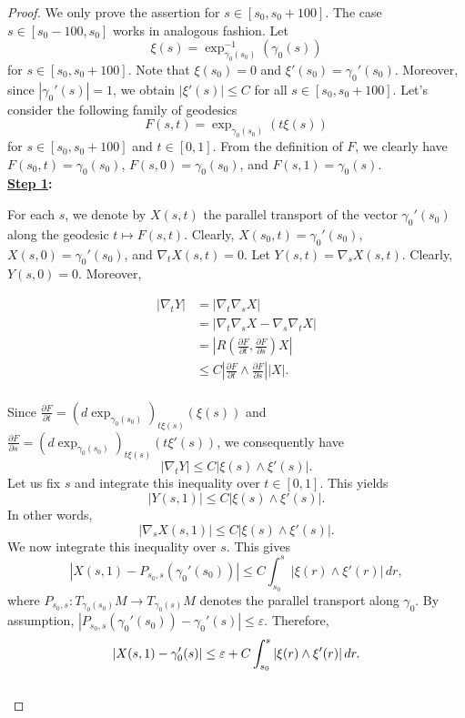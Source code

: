 \documentclass[a4paper, reqno]{amsart}
\theoremstyle{definition}
\theoremstyle{remark}
\numberwithin{equation}{section}
\numberwithin{equation}{section}
\numberwithin{equation}{section}
\begin{document}
\begin{proof}
We only prove the assertion for $s \in [s_0,s_0+100]$. The case $s \in [s_0-100,s_0]$ works in analogous fashion. Let
 \[\xi(s) = \exp_{\gamma_0(s_0)}^{-1}(\gamma_0(s))\]
  for $s \in [s_0,s_0+100]$. Note that $\xi(s_0)=0$ and $\xi'(s_0) = \gamma_0'(s_0)$. Moreover, since $|\gamma_0'(s)|=1$, we obtain $|\xi'(s)| \leq C$ for all $s \in [s_0,s_0+100]$. Let's consider the following family of geodesics
   \[F(s,t) = \exp_{\gamma_0(s_0)}(t \xi(s))\]
    for $s \in [s_0,s_0+100]$ and $t \in [0,1]$. From the definition of $F$, we clearly have $F(s_0,t) = \gamma_0(s_0)$, $F(s,0) = \gamma_0(s_0)$, and $F(s,1) = \gamma_0(s)$.\\ 
  
  \textbf{\underline{Step 1}:} 
   
    For each $s$, we denote by $X(s,t)$ the parallel transport of the vector $\gamma_0'(s_0)$ along the geodesic $t \mapsto F(s,t)$. Clearly, $X(s_0,t) = \gamma_0'(s_0)$, $X(s,0) = \gamma_0'(s_0)$, and $\nabla_t X(s,t) = 0$. Let $Y(s,t) = \nabla_s X(s,t)$. Clearly, $Y(s,0) = 0$. Moreover,  
    
\begin{align*} 
|\nabla_t Y| 
&= |\nabla_t \nabla_s X| \\ 
&= |\nabla_t \nabla_s X - \nabla_s \nabla_t X| \\ 
&= \left|R\left(\frac{\partial F}{\partial t},\frac{\partial F}{\partial s}\right)X\right| \\ 
&\leq C \left|\frac{\partial F}{\partial t} \wedge \frac{\partial F}{\partial s}\right| |X|.
\end{align*}\\
Since $\frac{\partial F}{\partial t} = (d\exp_{\gamma_0(s_0)})_{t \xi(s)}(\xi(s))$ and $\frac{\partial F}{\partial s} = (d\exp_{\gamma_0(s_0)})_{t \xi(s)}(t\xi'(s))$, we consequently have
\[ |\nabla_t Y| \leq C |\xi(s) \wedge \xi'(s)|.\]
Let us fix $s$ and integrate this inequality over $t \in [0,1]$. This yields 
\[|Y(s,1)| \leq C |\xi(s) \wedge \xi'(s)|.\] 
In other words, 
\[|\nabla_s X(s,1)| \leq C |\xi(s) \wedge \xi'(s)|.\] 
We now integrate this inequality over $s$. This gives 
\[|X(s,1) - P_{s_0,s} (\gamma_0'(s_0))| \leq C \int_{s_0}^s |\xi(r) \wedge \xi'(r)| \, dr,\] 
where $P_{s_0,s}: T_{\gamma_0(s_0)} M \to T_{\gamma_0(s)} M$ denotes the parallel transport along $\gamma_0$. By assumption, $|P_{s_0,s} (\gamma_0'(s_0)) - \gamma_0'(s)| \leq \varepsilon$. Therefore, 
\begin{equation}{\label{parallel vs parallel}}
	|X(s,1) - \gamma_0'(s)| \leq \varepsilon + C \int_{s_0}^s |\xi(r) \wedge \xi'(r)| \, dr.
\end{equation}\\


\end{proof}
\end{document}
